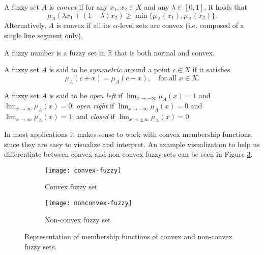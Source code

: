 \begin{definition}[Convexity] A fuzzy set $A$ is \textit{convex} if for any $x_1,x_2 \in X$ and any $\lambda \in [0,1]$, it holds that
\[
\mu_A(\lambda x_1 + (1-\lambda)x_2) \ge \min{\{ \mu_A(x_1), \mu_A(x_2)\}}.
\]
Alternatively, $A$ is convex if all its $\alpha$-level sets are convex (i.e. composed of a single line segment only).
\end{definition}

\begin{definition} A fuzzy number is a fuzzy set in $\mathbb{R}$ that is both normal and convex.
\end{definition}

\begin{definition}[Symmetry] A fuzzy set $A$ is said to be \textit{symmetric} around a point $c \in X$ if it satisfies
\[
\mu_A(c + x) = \mu_A(c - x), \quad \text{for all } x \in X.
\]

\end{definition}

\begin{definition} A fuzzy set $A$ is said to be \textit{open left} if $\displaystyle \lim_{x \to -\infty} \mu_A(x) = 1$ and $\displaystyle\lim_{x \to \infty} \mu_A(x) = 0$; \textit{open right} if $\displaystyle\lim_{x \to -\infty} \mu_A(x) = 0$ and $\displaystyle\lim_{x \to \infty} \mu_A(x) = 1$; and \textit{closed} if $\displaystyle\lim_{x \to \pm \infty} \mu_A(x) = 0$.

\end{definition}

In most applications it makes sense to work with convex membership functions, since they are easy to visualize and interpret. An example visualization to help us differentiate between convex and non-convex fuzzy sets can be seen in Figure \ref{fig:convex-fuzzy}.
\begin{figure}[h!]
\centering
\begin{subfigure}{.4\textwidth}
  \centering
  \texttt{[image: convex-fuzzy]}
  \caption{Convex fuzzy set}
  \label{fig:sub-first}
\end{subfigure}
\begin{subfigure}{.4\textwidth}
  \centering
  \texttt{[image: nonconvex-fuzzy]}
  \caption{Non-convex fuzzy set}
  \label{fig:sub-second}
\end{subfigure}
\caption{Representation of membership functions of convex and non-convex fuzzy sets.}
\label{fig:convex-fuzzy}
\end{figure}


